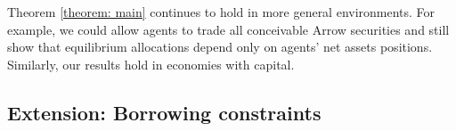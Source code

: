 \documentclass[thmsb,11pt]{article}
\begin{document}
Theorem \ref{theorem: main} continues to hold in more general environments. For example, we could allow
agents to trade all conceivable  Arrow securities and still show that  equilibrium
allocations depend only on agents' net assets positions.
Similarly, our results   hold in  economies with capital.
%

\subsection{Extension: Borrowing constraints}\label{Sec: extensions}
%
\end{document}
